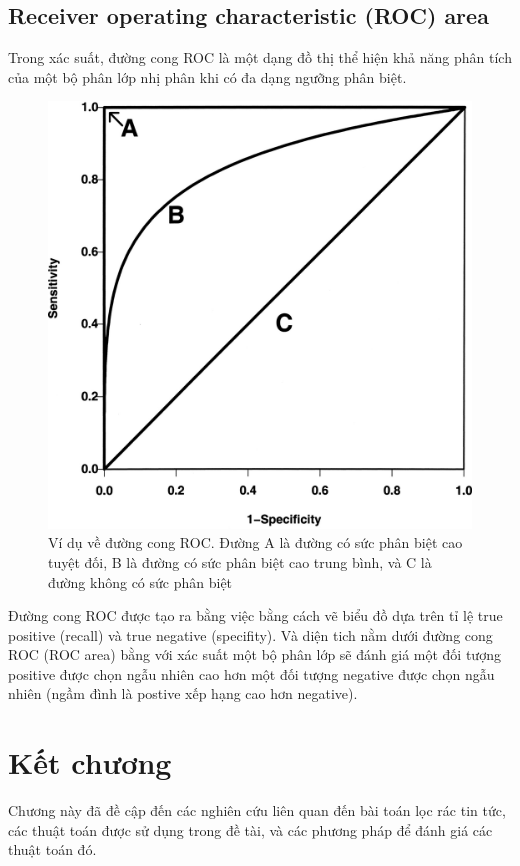\subsection{Receiver operating characteristic (ROC) area}
Trong  xác suất, đường cong ROC là một dạng đồ thị thể hiện khả năng phân tích của một bộ phân lớp nhị phân khi có đa dạng ngưỡng phân biệt.
\begin{figure}[H]
\centering
\includegraphics[width=0.9\linewidth]{Chapter2/Chapter2Figs/ROC.png}
\caption{Ví dụ về đường cong ROC\@. Đường A là đường có sức phân biệt cao tuyệt đối, B là đường có sức phân biệt cao trung bình, và C là đường không có sức phân biệt}
\end{figure}
Đường cong ROC được tạo ra bằng việc bằng cách vẽ biểu đồ dựa trên tỉ lệ true positive (recall) và true negative (specifity). Và diện tich nằm dưới đường cong ROC (ROC area) bằng với xác suất một bộ phân lớp sẽ đánh giá một đối tượng positive được chọn ngẫu nhiên cao hơn một đối tượng negative được chọn ngẫu nhiên (ngầm đình là postive xếp hạng cao hơn negative)\cite{Fawcett:2006:IRA:1159473.1159475}.

\section{Kết chương}
Chương này đã đề cập đến các nghiên cứu liên quan đến bài toán lọc rác tin tức, các thuật toán được sử dụng trong đề tài, và các phương pháp để đánh giá các thuật toán đó.